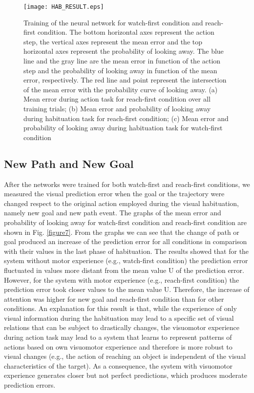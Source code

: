 \documentclass[conference]{IEEEtran}
\begin{document}
\begin{figure}
\centering
\texttt{[image: HAB\_RESULT.eps]}
\caption{Training of the neural network for watch-first condition and reach-first condition. The bottom horizontal axes represent the action step, the vertical axes represent the mean error and the top horizontal axes represent the probability of looking away. The blue line and the gray line are the mean error in function of the action step and the probability of looking away in function of the mean error, respectively. The red line and point represent the intersection of the mean error with the probability curve of looking away. (a) Mean error during action task for reach-first condition over all training trials; (b) Mean error and probability of looking away during habituation task for reach-first condition; (c) Mean error  and probability of looking away during habituation task for watch-first condition}
\label{Error}
\end{figure}

\subsection{New Path and New Goal}
After the networks were trained for both watch-first and reach-first conditions, we measured the visual prediction error when the goal or the trajectory were changed respect to the original action employed during the visual habituation, namely new goal and new path event. The graphs of the mean error and probability of looking away for watch-first condition and reach-first condition are shown in Fig. \ref{figure7}. From the graphs we can see that the change of path or goal produced an increase of the prediction error for all conditions in comparison with their values in the last phase of habituation. The results showed that for the system without motor experience (e.g., watch-first condition) the prediction error fluctuated in values more distant from the mean value \(\text{U}\) of the prediction error.  However, for the system with motor experience (e.g., reach-first condition) the prediction error took closer values to the mean value \(\text{U}\). Therefore, the increase of attention was higher for new goal and reach-first condition than for other conditions. An explanation for this result is that, while the experience of only visual information during the habituation may lead to a specific set of visual relations that can be subject to drastically changes, the visuomotor experience during action task may lead to a system that learns to represent patterns of actions based on own visuomotor experience and therefore is more robust to visual changes (e.g., the action of reaching an object is independent of the visual characteristics of the target). As a consequence, the system with visuomotor experience generates closer but not perfect predictions, which produces moderate prediction errors.
\end{document}
